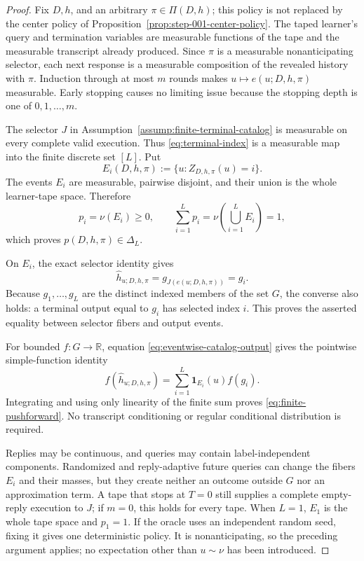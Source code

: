 \begin{proof}
Fix $D,h$, and an arbitrary $\pi\in\Pi(D,h)$; this policy is not replaced by
the center policy of Proposition~\ref{prop:step-001-center-policy}.  The
taped learner's query and termination variables are measurable functions of
the tape and the measurable transcript already produced.  Since $\pi$ is a
measurable nonanticipating selector, each next response is a measurable
composition of the revealed history with $\pi$.  Induction through at most
$m$ rounds makes $u\mapsto e(u;D,h,\pi)$ measurable.  Early stopping causes
no limiting issue because the stopping depth is one of
$0,1,\ldots,m$.

The selector $J$ in Assumption~\ref{assump:finite-terminal-catalog} is
measurable on every complete valid execution.  Thus
\eqref{eq:terminal-index} is a measurable map into the finite discrete set
$[L]$.  Put
\[
E_i(D,h,\pi):=\{u:Z_{D,h,\pi}(u)=i\}.
\]
The events $E_i$ are measurable, pairwise disjoint, and their union is the
whole learner-tape space.  Therefore
\begin{equation}\label{eq:simplex-masses}
p_i=\nu(E_i)\ge0,
\qquad
\sum_{i=1}^Lp_i
=\nu\!\left(\bigcup_{i=1}^LE_i\right)=1,
\end{equation}
which proves $p(D,h,\pi)\in\Delta_L$.

On $E_i$, the exact selector identity gives
\begin{equation}\label{eq:eventwise-catalog-output}
\widehat h_{u;D,h,\pi}
=g_{J(e(u;D,h,\pi))}=g_i.
\end{equation}
Because $g_1,\ldots,g_L$ are the distinct indexed members of the set $G$,
the converse also holds: a terminal output equal to $g_i$ has selected index
$i$.  This proves the asserted equality between selector fibers and output
events.

For bounded $f:G\to\mathbb R$, equation
\eqref{eq:eventwise-catalog-output} gives the pointwise simple-function
identity
\[
f(\widehat h_{u;D,h,\pi})
=\sum_{i=1}^L\mathbf 1_{E_i}(u)f(g_i).
\]
Integrating and using only linearity of the finite sum proves
\eqref{eq:finite-pushforward}.  No transcript conditioning or regular
conditional distribution is required.

Replies may be continuous, and queries may contain label-independent
components.  Randomized and reply-adaptive future queries can change the
fibers $E_i$ and their masses, but they create neither an outcome outside
$G$ nor an approximation term.  A tape that stops at $T=0$ still supplies a complete empty-reply
execution to $J$; if $m=0$, this holds for every tape.  When $L=1$, $E_1$
is the whole tape space and $p_1=1$.  If the oracle uses an independent
random seed, fixing it gives one deterministic policy.  It is
nonanticipating, so the preceding argument applies; no expectation other than
$u\sim\nu$ has been introduced.
\end{proof}

